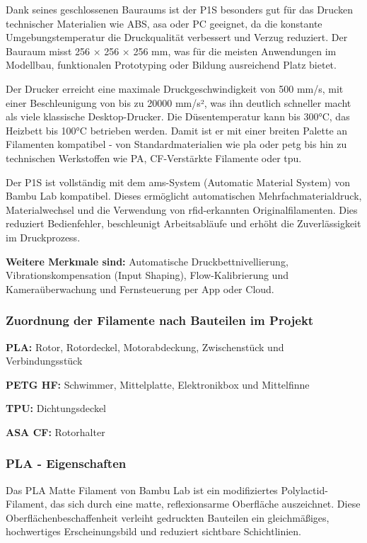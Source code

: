 \documentclass[a4paper,12pt]{article}
\begin{document}
Dank seines geschlossenen Bauraums ist der P1S besonders gut für das Drucken technischer Materialien wie ABS, \gls{asa} oder PC geeignet, da die konstante Umgebungstemperatur die Druckqualität verbessert und Verzug reduziert. Der Bauraum misst 256 × 256 × 256 mm, was für die meisten Anwendungen im Modellbau, funktionalen Prototyping oder Bildung ausreichend Platz bietet.

Der Drucker erreicht eine maximale Druckgeschwindigkeit von 500 mm/s, mit einer Beschleunigung von bis zu 20000 mm/s², was ihn deutlich schneller macht als viele klassische Desktop-Drucker. Die Düsentemperatur kann bis 300°C, das Heizbett bis 100°C betrieben werden. Damit ist er mit einer breiten Palette an Filamenten kompatibel - von Standardmaterialien wie \gls{pla} oder \gls{petg} bis hin zu technischen Werkstoffen wie PA, CF-Verstärkte Filamente oder \gls{tpu}.

Der P1S ist vollständig mit dem \gls{ams}-System (Automatic Material System) von Bambu Lab kompatibel. Dieses ermöglicht automatischen Mehrfachmaterialdruck, Materialwechsel und die Verwendung von \gls{rfid}-erkannten Originalfilamenten. Dies reduziert Bedienfehler, beschleunigt Arbeitsabläufe und erhöht die Zuverlässigkeit im Druckprozess.\newline

\textbf{Weitere Merkmale sind:} Automatische Druckbettnivellierung, Vibrationskompensation (Input Shaping), Flow-Kalibrierung und Kameraüberwachung und Fernsteuerung per App oder Cloud.\cite{Bambu_Lab_Drucker_P1S}

\newpage

\subsubsection{Zuordnung der Filamente nach Bauteilen im Projekt}
\label{sec:Zuordnung der Filamente}
\textbf{PLA:}
Rotor, Rotordeckel, Motorabdeckung, Zwischenstück und Verbindungsstück\newline

\textbf{PETG HF:}
Schwimmer, Mittelplatte, Elektronikbox und Mittelfinne\newline

\textbf{TPU:}
Dichtungsdeckel\newline

\textbf{ASA CF:}
Rotorhalter\newline


\subsubsection{PLA - Eigenschaften}
\label{sec:PLA}
Das PLA Matte Filament von Bambu Lab ist ein modifiziertes Polylactid-Filament, das sich durch eine matte, reflexionsarme Oberfläche auszeichnet. Diese Oberflächenbeschaffenheit verleiht gedruckten Bauteilen ein gleichmäßiges, hochwertiges Erscheinungsbild und reduziert sichtbare Schichtlinien.
\end{document}
